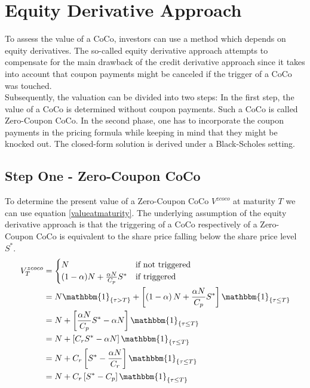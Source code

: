 \section{Equity Derivative Approach} \label{sec:equityderivativeapproach}

To assess the value of a CoCo, investors can use a method which depends on equity derivatives. \citep{de2011pricing, de2014handbook} The so-called equity derivative approach attempts to compensate for the main drawback of the credit derivative approach since it takes into account that coupon payments might be canceled if the trigger of a CoCo was touched.\\

Subsequently, the valuation can be divided into two steps: In the first step, the value of a CoCo is determined without coupon payments. Such a CoCo is called Zero-Coupon CoCo. In the second phase, one has to incorporate the coupon payments in the pricing formula while keeping in mind that they might be knocked out. The closed-form solution is derived under a Black-Scholes setting.

\subsection{Step One - Zero-Coupon CoCo}

To determine the present value of a Zero-Coupon CoCo $V^{zcoco}$ at maturity $T$ we can use equation \ref{valueatmaturity}. The underlying assumption of the equity derivative approach is that the triggering of a CoCo respectively of a Zero-Coupon CoCo is equivalent to the share price falling below the share price level $S^*$. %
\begin{align} \label{pvedcoco}    
    V^{zcoco}_T &= \begin{cases} N & \text{if not triggered}\\ (1 - \alpha) N + \frac{\alpha N}{C_p} S^{*} & \text{if triggered} \end{cases} \nonumber\\
    &= N \mathbbm{1}_{\{ \tau > T \}} +\left[ \left( 1 - \alpha \right) N + \dfrac{\alpha N}{C_p } S^* \right] \mathbbm{1}_{\{ \tau \leq T \}}\nonumber\\
    &= N + \left[ \dfrac{\alpha N}{C_p} S^* - \alpha N \right] \mathbbm{1}_{\{ \tau \leq T \}}\nonumber\\
    &= N + \left[ C_r S^* - \alpha N \right] \mathbbm{1}_{\{ \tau \leq T \}}\nonumber\\
    &= N + C_r \left[S^* - \dfrac{\alpha N}{C_r}\right] \mathbbm{1}_{\{ \tau \leq T \}}\nonumber\\
    &= N + C_r \left[ S^* - C_p \right] \mathbbm{1}_{\{ \tau \leq T \}}
\end{align}

